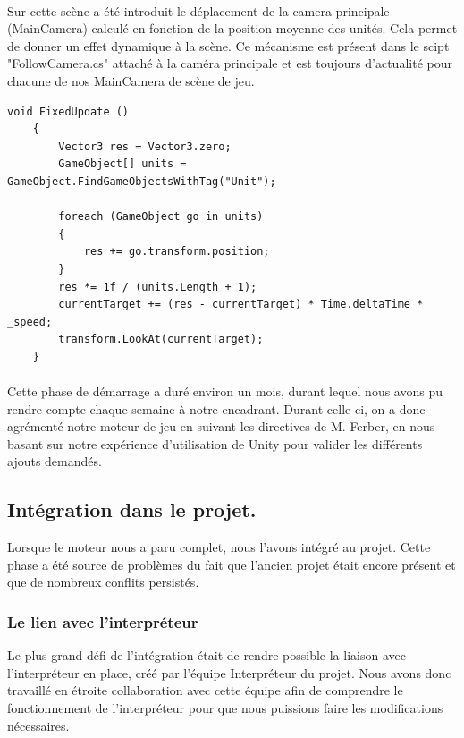 \documentclass{report}
\begin{document}
\paragraph{}
Sur cette scène a été introduit le déplacement de la camera principale (MainCamera) calculé en fonction de la position moyenne des unités. Cela permet de donner un effet dynamique à la scène. Ce mécanisme est présent dans le scipt "FollowCamera.cs" attaché à la caméra principale et est toujours d'actualité pour chacune de nos MainCamera de scène de jeu.
\begin{lstlisting}[language={[Sharp]C},label={lst:FollowCamera}, caption=  Extrait du code du script  FollowCamera.cs]
void FixedUpdate ()
    {
        Vector3 res = Vector3.zero;
        GameObject[] units = GameObject.FindGameObjectsWithTag("Unit");

        foreach (GameObject go in units)
        {
            res += go.transform.position;
        }
        res *= 1f / (units.Length + 1);
        currentTarget += (res - currentTarget) * Time.deltaTime * _speed;
        transform.LookAt(currentTarget);
    }
\end{lstlisting}
\paragraph{}
Cette phase de démarrage a duré environ un mois, durant lequel nous avons pu rendre compte chaque semaine à notre encadrant. Durant celle-ci, on a donc agrémenté notre moteur de jeu en suivant les directives de M. Ferber, en nous basant sur notre expérience d'utilisation de Unity pour valider les différents ajouts demandés.

\subsection{Intégration dans le projet.}
Lorsque le moteur nous a paru complet, nous l'avons intégré au projet. Cette phase a été source de problèmes du fait que l'ancien projet était encore présent et que de nombreux conflits persistés.

\subsubsection{Le lien avec l’interpréteur} 
Le plus grand défi de l’intégration était de rendre possible la liaison avec l’interpréteur en place, créé par l'équipe Interpréteur du projet. Nous avons donc travaillé en étroite collaboration avec cette équipe afin de comprendre le fonctionnement de l’interpréteur pour que nous puissions faire les modifications nécessaires.
\end{document}
